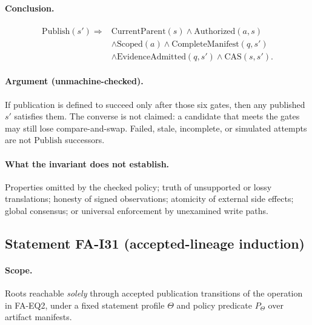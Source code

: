 \paragraph{Conclusion.}
\begin{equation}
\begin{aligned}
\mathrm{Publish}(s')\Rightarrow{}&\mathrm{CurrentParent}(s)\land\mathrm{Authorized}(a,s)\\
&\land\mathrm{Scoped}(a)\land\mathrm{CompleteManifest}(q,s')\\
&\land\mathrm{EvidenceAdmitted}(q,s')\land\mathrm{CAS}(s,s').
\end{aligned}
\tag{2$'$}
\end{equation}

\paragraph{Argument (unmachine-checked).}
If publication is defined to succeed only after those six gates, then any
published $s'$ satisfies them. The converse is not claimed: a candidate that
meets the gates may still lose compare-and-swap. Failed, stale, incomplete, or
simulated attempts are not $\mathrm{Publish}$ successors.

\paragraph{What the invariant does not establish.}
Properties omitted by the checked policy; truth of unsupported or lossy
translations; honesty of signed observations; atomicity of external side
effects; global consensus; or universal enforcement by unexamined write paths.

\subsection*{Statement FA-I31 (accepted-lineage induction)}
\label{stmt:fa-i31}

\paragraph{Scope.}
Roots reachable \emph{solely} through accepted publication transitions of the
operation in FA-EQ2, under a fixed statement profile $\Theta$ and policy
predicate $P_{\Theta}$ over artifact manifests.

